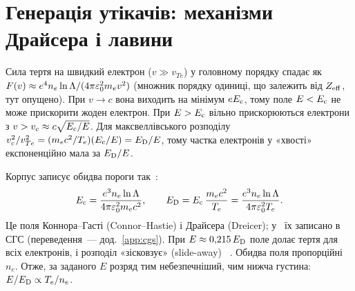 \section{Генерація утікачів: механізми Драйсера і лавини}\label{sec:09-gen}

\begin{outofcorpus}
Сила тертя на швидкий електрон ($v\gg v_{Te}$) у головному порядку спадає як
$F(v)\approx e^4n_e\ln\Lambda/(4\pi\varepsilon_0^2m_ev^2)$ (множник порядку одиниці, що залежить від $Z_{\mathrm{eff}}$,
тут опущено). При $v\to c$ вона виходить на мінімум $eE_{\mathrm{c}}$, тому поле $E<E_{\mathrm{c}}$ не може прискорити
жоден електрон. При $E>E_{\mathrm{c}}$ вільно прискорюються електрони з $v>v_c\approx c\sqrt{E_{\mathrm{c}}/E}$.
Для максвеллівського розподілу $v_c^2/v_{Te}^2=(m_ec^2/T_e)(E_{\mathrm{c}}/E)=E_{\mathrm{D}}/E$, тому частка електронів у
«хвості» експоненційно мала за $E_{\mathrm{D}}/E$.
\end{outofcorpus}

Корпус записує обидва пороги так~\cite[с.~9, (2.24)--(2.25)]{Hoppe2022}:
\begin{equation}\label{eq:09-Ec}
  E_{\mathrm{c}}=\frac{e^3n_e\ln\Lambda}{4\pi\varepsilon_0^2m_ec^2},\qquad
  E_{\mathrm{D}}=E_{\mathrm{c}}\,\frac{m_ec^2}{T_e}=\frac{e^3n_e\ln\Lambda}{4\pi\varepsilon_0^2T_e}.
\end{equation}
Це поля Коннора--Гасті (Connor--Hastie) і Драйсера (Dreicer); у~\cite[с.~66--67, (3.2), (3.7)]{Marchuk2025}
їх записано в СГС (переведення~--- дод.~\ref{app:cgs}).
При $E\approx0{,}215\,E_{\mathrm{D}}$ поле долає тертя для всіх електронів, і розподіл «зісковзує» (slide-away)
~\cite[с.~9]{Hoppe2022}. Обидва поля пропорційні $n_e$. Отже, за заданого $E$ розряд тим небезпечніший,
чим нижча густина: $E/E_{\mathrm{D}}\propto T_e/n_e$.

